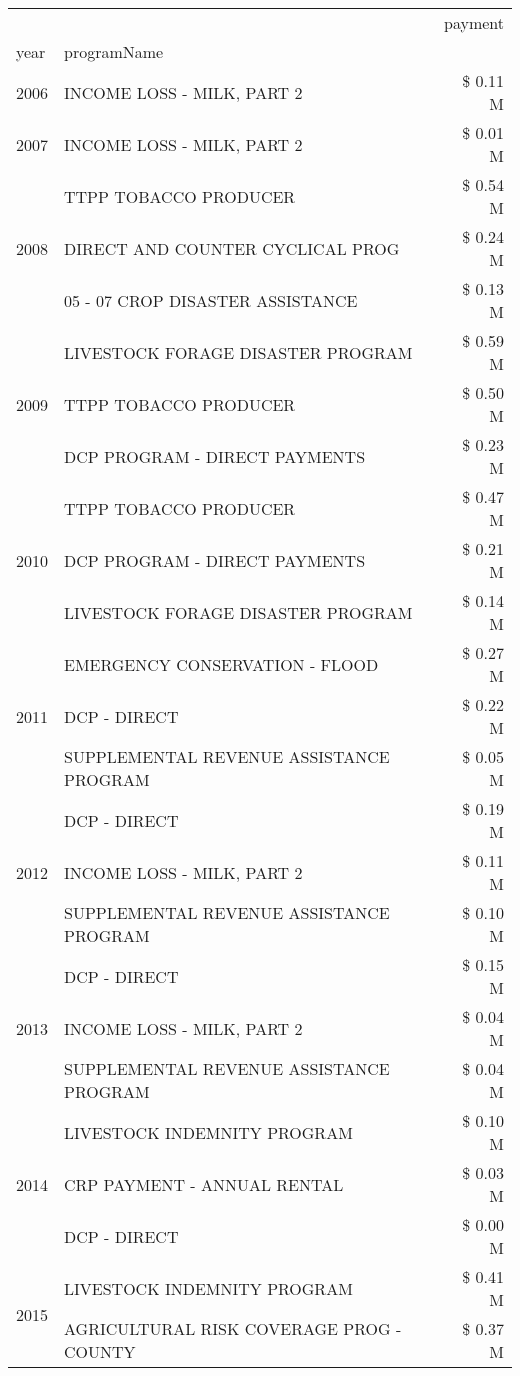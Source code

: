 \begin{tabular}{llr}
\toprule
 &  & payment \\
year & programName &  \\
\midrule
2006 & INCOME LOSS - MILK, PART 2 & \$ 0.11 M \\
\cline{1-3}
2007 & INCOME LOSS - MILK, PART 2 & \$ 0.01 M \\
\cline{1-3}
\multirow[t]{3}{*}{2008} & TTPP TOBACCO PRODUCER & \$ 0.54 M \\
 & DIRECT AND COUNTER CYCLICAL PROG & \$ 0.24 M \\
 & 05 - 07 CROP DISASTER ASSISTANCE & \$ 0.13 M \\
\cline{1-3}
\multirow[t]{3}{*}{2009} & LIVESTOCK FORAGE DISASTER  PROGRAM & \$ 0.59 M \\
 & TTPP TOBACCO PRODUCER & \$ 0.50 M \\
 & DCP PROGRAM - DIRECT PAYMENTS & \$ 0.23 M \\
\cline{1-3}
\multirow[t]{3}{*}{2010} & TTPP TOBACCO PRODUCER & \$ 0.47 M \\
 & DCP PROGRAM - DIRECT PAYMENTS & \$ 0.21 M \\
 & LIVESTOCK FORAGE DISASTER  PROGRAM & \$ 0.14 M \\
\cline{1-3}
\multirow[t]{3}{*}{2011} & EMERGENCY CONSERVATION - FLOOD & \$ 0.27 M \\
 & DCP - DIRECT & \$ 0.22 M \\
 & SUPPLEMENTAL REVENUE ASSISTANCE PROGRAM & \$ 0.05 M \\
\cline{1-3}
\multirow[t]{3}{*}{2012} & DCP - DIRECT & \$ 0.19 M \\
 & INCOME LOSS - MILK, PART 2 & \$ 0.11 M \\
 & SUPPLEMENTAL REVENUE ASSISTANCE PROGRAM & \$ 0.10 M \\
\cline{1-3}
\multirow[t]{3}{*}{2013} & DCP - DIRECT & \$ 0.15 M \\
 & INCOME LOSS - MILK, PART 2 & \$ 0.04 M \\
 & SUPPLEMENTAL REVENUE ASSISTANCE PROGRAM & \$ 0.04 M \\
\cline{1-3}
\multirow[t]{3}{*}{2014} & LIVESTOCK INDEMNITY PROGRAM & \$ 0.10 M \\
 & CRP PAYMENT - ANNUAL RENTAL & \$ 0.03 M \\
 & DCP - DIRECT & \$ 0.00 M \\
\cline{1-3}
\multirow[t]{3}{*}{2015} & LIVESTOCK INDEMNITY PROGRAM & \$ 0.41 M \\
 & AGRICULTURAL RISK COVERAGE PROG - COUNTY & \$ 0.37 M \\

\end{tabular}
